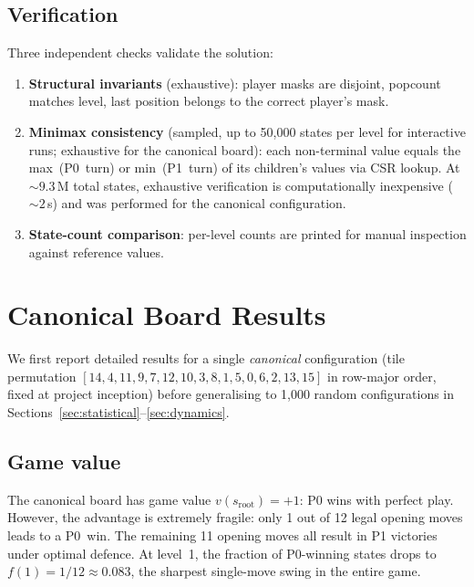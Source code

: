 \documentclass[11pt,a4paper]{article}
\begin{document}
\subsection{Verification}

Three independent checks validate the solution:
\begin{enumerate}
  \item \textbf{Structural invariants} (exhaustive): player masks are
    disjoint, popcount matches level, last position belongs to the correct
    player's mask.
  \item \textbf{Minimax consistency} (sampled, up to 50{,}000 states per
    level for interactive runs; exhaustive for the canonical board): each
    non-terminal value equals the max~(P0~turn) or min~(P1~turn) of its
    children's values via CSR lookup.  At ${\sim}9.3$\,M total states,
    exhaustive verification is computationally inexpensive
    (${\sim}2$\,s) and was performed for the canonical configuration.
  \item \textbf{State-count comparison}: per-level counts are printed for
    manual inspection against reference values.
\end{enumerate}

\section{Canonical Board Results}

We first report detailed results for a single \emph{canonical}
configuration (tile permutation $[14, 4, 11, 9, 7, 12, 10, 3, 8, 1, 5,
0, 6, 2, 13, 15]$ in row-major order, fixed at project inception) before
generalising to 1{,}000 random configurations in
Sections~\ref{sec:statistical}--\ref{sec:dynamics}.

\subsection{Game value}

The canonical board has game value $v(s_{\text{root}}) = +1$: P0 wins with
perfect play.  However, the advantage is extremely fragile: only 1 out of
12 legal opening moves leads to a P0~win.  The remaining 11 opening moves
all result in P1 victories under optimal defence.  At level~1, the fraction
of P0-winning states drops to $f(1) = 1/12 \approx 0.083$, the sharpest
single-move swing in the entire game.
\end{document}
